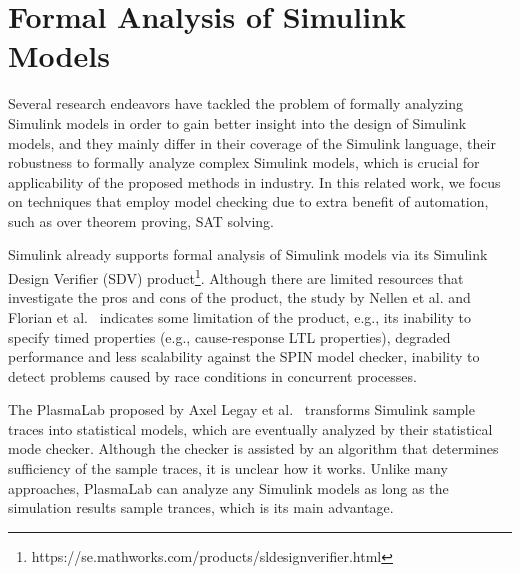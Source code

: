 \section{Formal Analysis of Simulink Models}
Several research endeavors have tackled the problem of formally analyzing Simulink models in order to gain better insight into the design of Simulink models, and they mainly differ in their coverage of the Simulink language, their robustness to formally analyze complex Simulink models, which is crucial for applicability of the proposed methods in industry. In this related work, we focus on techniques that employ model checking due to extra benefit of automation, such as over theorem proving, SAT solving.%

Simulink already supports formal analysis of Simulink models via its Simulink Design Verifier (SDV) product\footnote{https://se.mathworks.com/products/sldesignverifier.html}. Although there are limited resources that investigate the pros and cons of the product, the study by Nellen et al. \cite{Nellen2018FormalRecommendations} and Florian et al.~\cite{Leitner2008SimulinkStudy} indicates some limitation of the product, e.g., its inability to specify timed properties (e.g., cause-response LTL properties), degraded performance and less scalability against the SPIN model checker, inability to detect problems caused by race conditions in concurrent processes. 

The PlasmaLab proposed by Axel Legay et al.~\cite{Legay2016StatisticalLab} transforms Simulink sample traces into statistical models, which are eventually analyzed by their statistical mode checker. Although the checker is assisted by an algorithm that determines sufficiency of the sample traces, it is unclear how it works. Unlike many approaches, PlasmaLab can analyze any Simulink models as long as the simulation results sample trances, which is its main advantage. %

